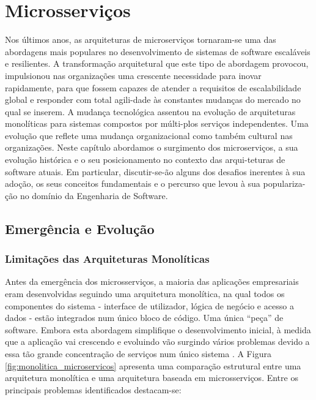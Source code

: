 \chapter{Microsserviços}

Nos últimos anos, as arquiteturas de microserviços tornaram-se uma das abordagens mais populares no desenvolvimento de sistemas de software escaláveis e resilientes. A transformação arquitetural que este tipo de abordagem provocou, impulsionou nas organizações uma crescente necessidade para inovar rapidamente, para que fossem capazes de atender a requisitos de escalabilidade global e responder com total agili-dade às constantes mudanças do mercado no qual se inserem. A mudança tecnológica assentou na evolução de arquiteturas monolíticas para sistemas compostos por múlti-plos serviços independentes. Uma evolução que reflete uma mudança organizacional como também cultural nas organizações. Neste capítulo abordamos o surgimento dos microserviços, a sua evolução histórica e o seu posicionamento no contexto das arqui-teturas de software atuais. Em particular, discutir-se-ão alguns dos desafios inerentes à sua adoção, os seus conceitos fundamentais e o percurso que levou à sua populariza-ção no domínio da Engenharia de Software.

\section{Emergência e Evolução}

\subsection{Limitações das Arquiteturas Monolíticas}

Antes da emergência dos microsserviços, a maioria das aplicações empresariais eram desenvolvidas seguindo uma arquitetura monolítica, na qual todos os componentes do sistema - interface de utilizador, lógica de negócio e acesso a dados - estão integrados num único bloco de código. Uma única “peça” de software. Embora esta abordagem simplifique o desenvolvimento inicial, à medida que a aplicação vai crescendo e evoluindo vão surgindo vários problemas devido a essa tão grande concentração de serviços num único sistema \cite{Villamizar2015}. A Figura \ref{fig:monolitica_microservicos} apresenta uma comparação estrutural entre uma arquitetura monolítica e uma arquitetura baseada em microsserviços. Entre os principais problemas identificados destacam-se:

